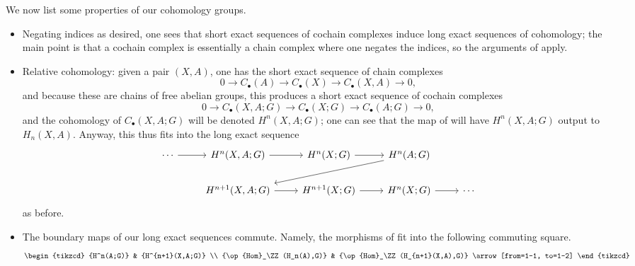 \documentclass[../notes.tex]{subfiles}
\begin{document}
We now list some properties of our cohomology groups.
\begin{itemize}
	\item Negating indices as desired, one sees that short exact sequences of cochain complexes induce long exact sequences of cohomology; the main point is that a cochain complex is essentially a chain complex where one negates the indices, so the arguments of  apply.
	\item Relative cohomology: given a pair $(X,A)$, one has the short exact sequence of chain complexes
	\[0\to C_\bullet(A)\to C_\bullet(X)\to C_\bullet(X,A)\to0,\]
	and because these are chains of free abelian groups, this produces a short exact sequence of cochain complexes
	\[0\to C_\bullet(X,A;G)\to C_\bullet(X;G)\to C_\bullet(A;G)\to0,\]
	and the cohomology of $C_\bullet(X,A;G)$ will be denoted $H^n(X,A;G)$; one can see that the map of  will have $H^n(X,A;G)$ output to $H_n(X,A)$. Anyway, this thus fits into the long exact sequence
	\[\begin{tikzcd}
		\cdots & {H^n(X,A;G)} & {H^n(X;G)} & {H^n(A;G)} \\
		& {H^{n+1}(X,A;G)} & {H^{n+1}(X;G)} & {H^n(X;G)} & \cdots
		\arrow[from=1-1, to=1-2]
		\arrow[from=1-2, to=1-3]
		\arrow[from=1-3, to=1-4]
		\arrow[from=1-4, to=2-2]
		\arrow[from=2-2, to=2-3]
		\arrow[from=2-3, to=2-4]
		\arrow[from=2-4, to=2-5]
	\end{tikzcd}\]
	as before.
	\item The boundary maps of our long exact sequences commute. Namely, the morphisms of  fit into the following commuting square.
	\[\begin{tikzcd}
		{H^n(A;G)} & {H^{n+1}(X,A;G)} \\
		{\op{Hom}_\ZZ(H_n(A),G)} & {\op{Hom}_\ZZ(H_{n+1}(X,A),G)}
		\arrow[from=1-1, to=1-2]

\end{tikzcd}\]
\end{itemize}
\end{document}

